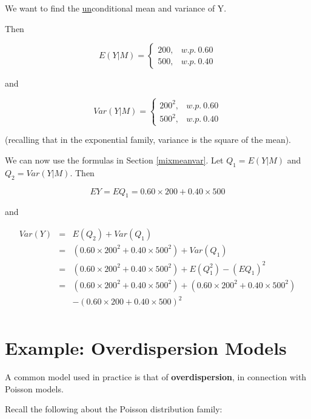 \documentclass[11pt]{article}
\begin{document}
We want to find the \underline{un}conditional mean and variance of Y.

Then

\begin{equation}
\label{batt1}
E(Y|M)=\left\{ \begin{array}{rl}
200, & w.p. ~ 0.60 \\
500, & w.p. ~ 0.40
\end{array}\right. 
\end{equation}

and 

\begin{equation}
\label{batt2}
Var(Y|M)=\left\{ \begin{array}{rl}
200^2, & w.p. ~ 0.60 \\
500^2, & w.p. ~ 0.40
\end{array}\right. 
\end{equation}

(recalling that in the exponential family, variance is the square of the
mean).

We can now use the formulas in Section \ref{mixmeanvar}.  Let $Q_1 =
E(Y|M)$  and $Q_2 = Var(Y|M)$.  Then

\begin{equation}
EY = EQ_1 = 0.60 \times 200 + 0.40 \times 500
\end{equation}

and 

\begin{eqnarray}
Var(Y) &=& E(Q_2) + Var(Q_1) \\
&=& (0.60 \times 200^2 + 0.40 \times 500^2) + Var(Q_1) \\
&=& (0.60 \times 200^2 + 0.40 \times 500^2) + E(Q_1^2) - (EQ_1)^2 \\
&=& (0.60 \times 200^2 + 0.40 \times 500^2) + (0.60 \times 200^2 + 0.40
\times 500^2)  \\
& & - (0.60 \times 200 + 0.40 \times 500)^2 \\
\end{eqnarray}

\section{Example:  Overdispersion Models}

A common model used in practice is that of {\bf overdispersion}, in
connection with Poisson models.  

Recall the following about the Poisson distribution family:
\end{document}
